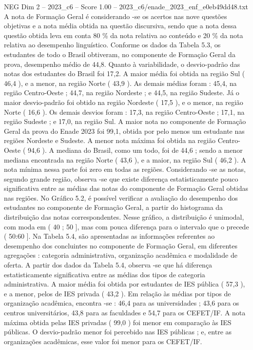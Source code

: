 \begin{textsample}{NEG Dim 2 – 2023\_c6 – Score 1.00 – 2023\_c6/enade\_2023\_enf\_e0eb49dd48.txt}
A nota de Formação Geral é considerando -se os acertos nas nove questões objetivas e a nota média obtida na questão discursiva, sendo que a nota dessa questão obtida leva em conta 80 \% da nota relativa ao conteúdo e 20 \% da nota relativa ao desempenho linguístico.
Conforme os dados da Tabela 5.3, os estudantes de todo o Brasil obtiveram, no componente de Formação Geral da prova, desempenho médio de 44,8.
Quanto à variabilidade, o desvio-padrão das notas dos estudantes do Brasil foi 17,2.
A maior média foi obtida na região Sul ( 46,4 ), e a menor, na região Norte ( 43,9 ).
As demais médias foram : 45,4, na região Centro-Oeste ; 44,7, na região Nordeste ; e 44,5, na região Sudeste.
Já o maior desvio-padrão foi obtido na região Nordeste ( 17,5 ), e o menor, na região Norte ( 16,6 ).
Os demais desvios foram : 17,3, na região Centro-Oeste ; 17,1, na região Sudeste ; e 17,0, na região Sul.
A maior nota no componente de Formação Geral da prova do Enade 2023 foi 99,1, obtida por pelo menos um estudante nas regiões Nordeste e Sudeste.
A menor nota máxima foi obtida na região Centro-Oeste ( 94,6 ).
A mediana do Brasil, como um todo, foi de 44,6 ; sendo a menor mediana encontrada na região Norte ( 43,6 ), e a maior, na região Sul ( 46,2 ).
A nota mínima nessa parte foi zero em todas as regiões.
Considerando -se as notas, segundo grande região, observa -se que existe diferença estatisticamente pouco significativa entre as médias das notas do componente de Formação Geral obtidas nas regiões.
No Gráfico 5.2, é possível verificar a avaliação do desempenho dos estudantes no componente de Formação Geral, a partir do histograma da distribuição das notas correspondentes.
Nesse gráfico, a distribuição é unimodal, com moda em ( 40 ; 50 ], mas com pouca diferença para o intervalo que o precede ( 50:60 ].
Na Tabela 5.4, são apresentadas as informações referentes ao desempenho dos concluintes no componente de Formação Geral, em diferentes agregações : categoria administrativa, organização acadêmica e modalidade de oferta.
A partir dos dados da Tabela 5.4, observa -se que há diferença estatisticamente significativa entre as médias dos tipos de categoria administrativa.
A maior média foi obtida por estudantes de IES pública ( 57,3 ), e a menor, pelos de IES privada ( 43,2 ).
Em relação às médias por tipos de organização acadêmica, encontra -se : 46,4 para as universidades ; 43,6 para os centros universitários, 43,8 para as faculdades e 54,7 para os CEFET/IF.
A nota máxima obtida pelas IES privadas ( 99,0 ) foi menor em comparação às IES públicas.
O desvio-padrão menor foi percebido nas IES públicas ; e, entre as organizações acadêmicas, esse valor foi menor para os CEFET/IF.

\end{textsample}

